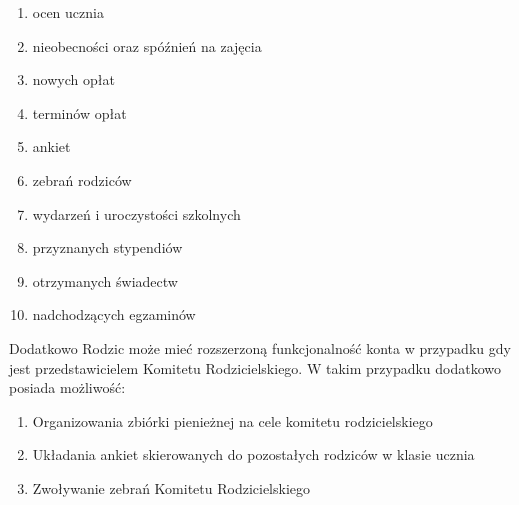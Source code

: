\documentclass{article}
\begin{document}
\begin{enumerate}
	\begin{enumerate}
		\item 	ocen ucznia
		\item nieobecności oraz spóźnień na zajęcia
		\item nowych opłat
		\item terminów opłat 
		\item ankiet
		\item zebrań rodziców
		\item wydarzeń i uroczystości szkolnych
		\item przyznanych stypendiów
		\item otrzymanych świadectw
		\item nadchodzących egzaminów
	\end{enumerate}	
\end{enumerate}

Dodatkowo Rodzic może mieć rozszerzoną funkcjonalność konta w przypadku gdy jest przedstawicielem Komitetu Rodzicielskiego. W takim przypadku dodatkowo posiada możliwość:
\begin{enumerate}
	\item Organizowania zbiórki pienieżnej na cele komitetu rodzicielskiego
	\item Układania ankiet skierowanych do pozostałych rodziców w klasie ucznia
	\item Zwoływanie zebrań Komitetu Rodzicielskiego
\end{enumerate}
\end{document}
